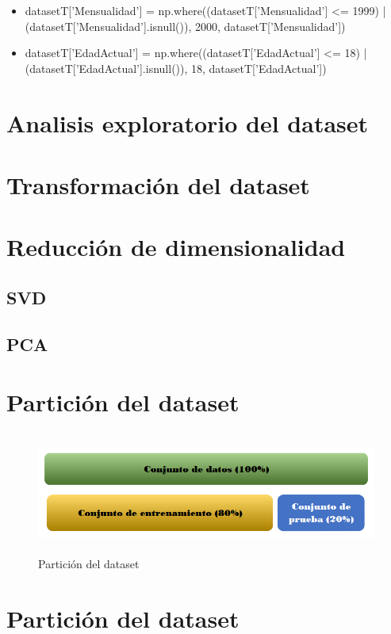 \begin{tcolorbox}[colback=gray!20, colframe=gray!80, width=\textwidth]

    \begin{itemize}

        \item datasetT['Mensualidad'] = np.where((datasetT['Mensualidad'] <= 1999) | (datasetT['Mensualidad'].isnull()), 2000, datasetT['Mensualidad'])
        
        \item datasetT['EdadActual'] = np.where((datasetT['EdadActual'] <= 18) | (datasetT['EdadActual'].isnull()), 18, datasetT['EdadActual'])
        
    \end{itemize}

\end{tcolorbox}


 

\section{Analisis exploratorio del dataset}

\section{Transformación del dataset}

\section{Reducción de dimensionalidad}

\subsection{SVD}
\subsection{PCA}

\section{Partición del dataset}

    \begin{figure} [H]
        \centering
        \includegraphics[width=12cm, height=4cm ]{Imagenes/ParticionDEdatos.PNG }
        \caption{Partición del dataset}
        \label{fig:parti}
    \end{figure}

\section{Partición del dataset}



